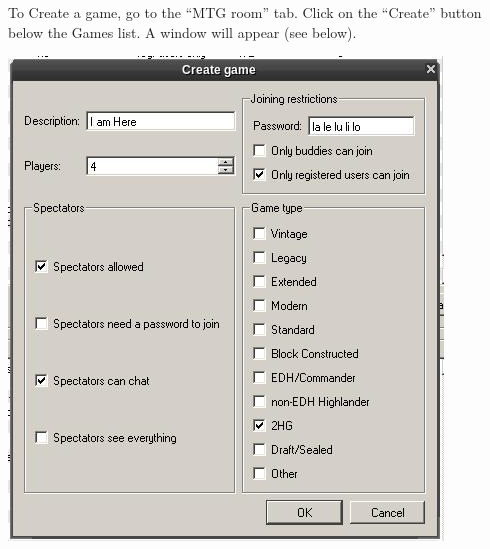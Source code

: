\documentclass[a4paper]{scrbook}
\begin{document}
To Create a game, go to the “MTG room” tab. Click on the “Create” button below the Games list. A window will appear (see below).
\begin{center}
\includegraphics[scale=0.5]{pics/fetch54df}
\end{center}
\end{document}
